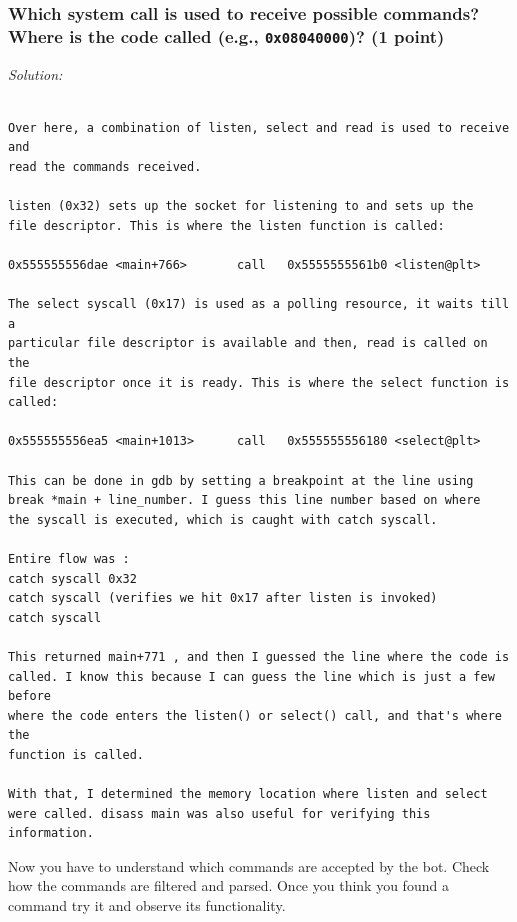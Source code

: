 \documentclass[a4paper,11pt]{article}
\newenvironment{solution}%
{\par{\noindent\small\textit{Solution:}}\vspace{-12pt}\begin{framed}}%
{\end{framed}\par}
\begin{document}
\subsubsection*{Which system call is used to receive possible commands? Where is the code called (e.g., \texttt{0x08040000})? \ifsolution (1 point) \fi}
\ifsolution
\begin{solution}

\begin{verbatim}

Over here, a combination of listen, select and read is used to receive and
read the commands received.
    
listen (0x32) sets up the socket for listening to and sets up the
file descriptor. This is where the listen function is called: 

0x555555556dae <main+766>       call   0x5555555561b0 <listen@plt>

The select syscall (0x17) is used as a polling resource, it waits till a 
particular file descriptor is available and then, read is called on the
file descriptor once it is ready. This is where the select function is
called: 

0x555555556ea5 <main+1013>      call   0x555555556180 <select@plt>

This can be done in gdb by setting a breakpoint at the line using
break *main + line_number. I guess this line number based on where 
the syscall is executed, which is caught with catch syscall.

Entire flow was :
catch syscall 0x32
catch syscall (verifies we hit 0x17 after listen is invoked)
catch syscall 

This returned main+771 , and then I guessed the line where the code is
called. I know this because I can guess the line which is just a few before
where the code enters the listen() or select() call, and that's where the
function is called.

With that, I determined the memory location where listen and select
were called. disass main was also useful for verifying this information.

\end{verbatim}

\end{solution}\fi


Now you have to understand which commands are accepted by the bot. Check how the
commands are filtered and parsed. Once you think you found a command try it and
observe its functionality.
\end{document}
